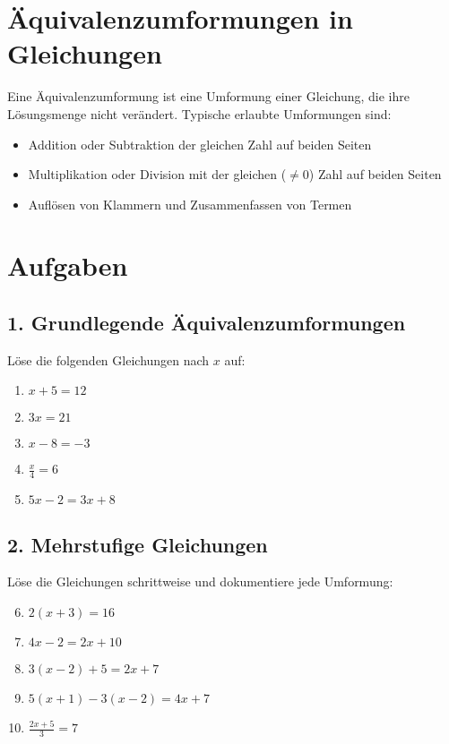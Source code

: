 

\section*{Äquivalenzumformungen in Gleichungen}
Eine Äquivalenzumformung ist eine Umformung einer Gleichung, die ihre Lösungsmenge nicht verändert. Typische erlaubte Umformungen sind:
\begin{itemize}
    \item Addition oder Subtraktion der gleichen Zahl auf beiden Seiten
    \item Multiplikation oder Division mit der gleichen ($\neq0$) Zahl auf beiden Seiten
    \item Auflösen von Klammern und Zusammenfassen von Termen
\end{itemize}

\section*{Aufgaben}

\subsection*{1. Grundlegende Äquivalenzumformungen}
Löse die folgenden Gleichungen nach \( x \) auf:
\begin{enumerate}
    \item \( x + 5 = 12 \)
    \item \( 3x = 21 \)
    \item \( x - 8 = -3 \)
    \item \( \frac{x}{4} = 6 \)
    \item \( 5x - 2 = 3x + 8 \)
\end{enumerate}

\subsection*{2. Mehrstufige Gleichungen}
Löse die Gleichungen schrittweise und dokumentiere jede Umformung:
\begin{enumerate}
    \setcounter{enumi}{5}
    \item \( 2(x + 3) = 16 \)
    \item \( 4x - 2 = 2x + 10 \)
    \item \( 3(x - 2) + 5 = 2x + 7 \)
    \item \( 5(x + 1) - 3(x - 2) = 4x + 7 \)
    \item \( \frac{2x + 5}{3} = 7 \)
\end{enumerate}

